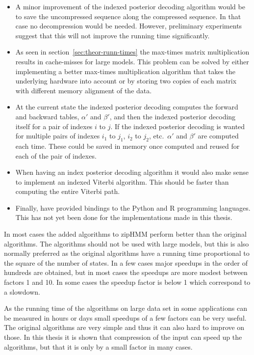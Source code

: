 \begin{itemize}
\item A minor improvement of the indexed posterior decoding algorithm would be
  to save the uncompressed sequence along the compressed sequence. In that case
  no decompression would be needed. However, preliminary experiments suggest
  that this will not improve the running time significantly.
\item As seen in section~\ref{sec:theor-runn-times} the max-times matrix
  multiplication results in cache-misses for large models. This problem can be
  solved by either implementing a better max-times multiplication algorithm
  that takes the underlying hardware into account or by storing two copies of
  each matrix with different memory alignment of the data.
\item At the current state the indexed posterior decoding computes the forward
  and backward tables, $\alpha'$ and $\beta'$, and then the indexed posterior
  decoding itself for a pair of indexes $i$ to $j$. If the indexed posterior
  decoding is wanted for multiple pairs of indexes $i_1$ to $j_1$, $i_2$ to
  $j_2$, etc.\ $\alpha'$ and $\beta'$ are computed each time. These could be
  saved in memory once computed and reused for each of the pair of indexes.
\item When having an index posterior decoding algorithm it would also make
  sense to implement an indexed Viterbi algorithm. This should be faster than
  computing the entire Viterbi path.
\item Finally, \citet{sand2013ziphmmlib} have provided bindings to the Python
  and R programming languages. This has not yet been done for the
  implementations made in this thesis.
\end{itemize}

In most cases the added algorithms to zipHMM perform better than the original
algorithms. The algorithms should not be used with large models, but this is
also normally preferred as the original algorithms have a running time
proportional to the square of the number of states. In a few cases major
speedups in the order of hundreds are obtained, but in most cases the speedups
are more modest between factors 1 and 10. In some cases the speedup factor is
below 1 which correspond to a slowdown.

As the running time of the algorithms on large data set in some applications
can be measured in hours or days small speedups of a few factors can be very
useful. The original algorithms are very simple and thus it can also hard to
improve on those. In this thesis it is shown that compression of the input can
speed up the algorithms, but that it is only by a small factor in many cases.

